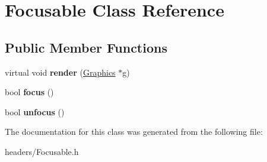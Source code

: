\hypertarget{class_focusable}{}\section{Focusable Class Reference}
\label{class_focusable}
\subsection*{Public Member Functions}
\begin{DoxyCompactItemize}
\item 
\hypertarget{class_focusable_aac64d80112af583baf9ea8454ed8c26a}{}\label{class_focusable_aac64d80112af583baf9ea8454ed8c26a} 
virtual void {\bfseries render} (\hyperlink{class_graphics}{Graphics} $\ast$g)
\item 
\hypertarget{class_focusable_abedddc31795aa7df783ada9eb81b5138}{}\label{class_focusable_abedddc31795aa7df783ada9eb81b5138} 
bool {\bfseries focus} ()
\item 
\hypertarget{class_focusable_a2a33756c950740cb2c7597479df5727d}{}\label{class_focusable_a2a33756c950740cb2c7597479df5727d} 
bool {\bfseries unfocus} ()
\end{DoxyCompactItemize}


The documentation for this class was generated from the following file\+:\begin{DoxyCompactItemize}
\item 
headers/Focusable.\+h\end{DoxyCompactItemize}
